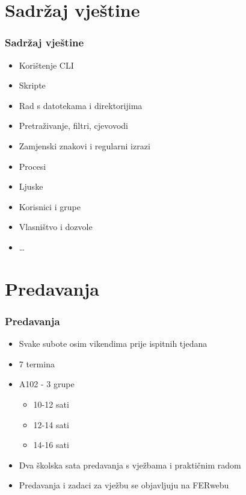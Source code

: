 \documentclass{beamer}
\begin{document}
\section{Sadržaj vještine}
\begin{frame}[t]
	\frametitle{Sadržaj vještine}
	\begin{itemize}
		\item Korištenje CLI
		\item Skripte
		\item Rad s datotekama i direktorijima
		\item Pretraživanje, filtri, cjevovodi
		\item Zamjenski znakovi i regularni izrazi
		\item Procesi
		\item Ljuske
		\item Korisnici i grupe
		\item Vlasništvo i dozvole
		\item \ldots
	\end{itemize}
\end{frame}

\section{Predavanja}
\begin{frame}[t]
\frametitle{Predavanja}
\begin{itemize}
	\item Svake subote osim vikendima prije ispitnih tjedana
	\item 7 termina
	\item A102 - 3 grupe
	\begin{itemize}
		\item 10-12 sati
		\item 12-14 sati
		\item 14-16 sati
	\end{itemize}
	\item Dva školska sata predavanja s vježbama i praktičnim radom
	\item Predavanja i zadaci za vježbu se objavljuju na FERwebu
\end{itemize}
\end{frame}
\end{document}
